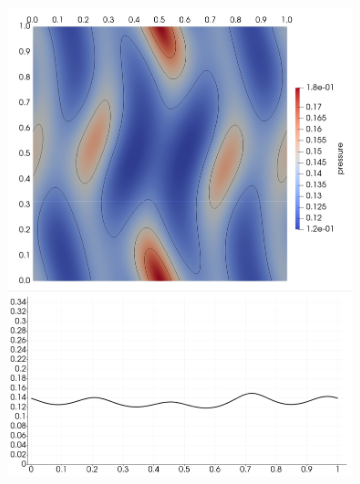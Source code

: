\begin{figure}[H]
\centering
\begin{subfigure}[b]{0.425\textwidth}\includegraphics[width=\textwidth]{img/ot/my1.jpg}\end{subfigure}
\hspace{12mm}

\end{figure}
